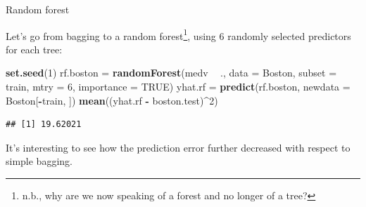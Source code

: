 \documentclass[10pt,ignorenonframetext,]{beamer}
\newenvironment{Shaded}{\begin{snugshade}}{\end{snugshade}}
\newcommand{\KeywordTok}[1]{\textcolor[rgb]{0.13,0.29,0.53}{\textbf{#1}}}
\newcommand{\DataTypeTok}[1]{\textcolor[rgb]{0.13,0.29,0.53}{#1}}
\newcommand{\DecValTok}[1]{\textcolor[rgb]{0.00,0.00,0.81}{#1}}
\newcommand{\StringTok}[1]{\textcolor[rgb]{0.31,0.60,0.02}{#1}}
\newcommand{\OtherTok}[1]{\textcolor[rgb]{0.56,0.35,0.01}{#1}}
\newcommand{\OperatorTok}[1]{\textcolor[rgb]{0.81,0.36,0.00}{\textbf{#1}}}
\newcommand{\NormalTok}[1]{#1}
\begin{document}
\begin{frame}[fragile]

\begin{block}{Random forest}

\vspace{2mm}

Let's go from bagging to a random
forest\footnote{n.b., why are we now speaking of a forest and no longer of a tree?},
using 6 randomly selected predictors for each tree:

\scriptsize

\begin{Shaded}
\begin{Highlighting}[]
\KeywordTok{set.seed}\NormalTok{(}\DecValTok{1}\NormalTok{)}
\NormalTok{rf.boston =}\StringTok{ }\KeywordTok{randomForest}\NormalTok{(medv }\OperatorTok{~}\StringTok{ }\NormalTok{., }\DataTypeTok{data =}\NormalTok{ Boston, }\DataTypeTok{subset =}\NormalTok{ train, }\DataTypeTok{mtry =} \DecValTok{6}\NormalTok{, }
    \DataTypeTok{importance =} \OtherTok{TRUE}\NormalTok{)}
\NormalTok{yhat.rf =}\StringTok{ }\KeywordTok{predict}\NormalTok{(rf.boston, }\DataTypeTok{newdata =}\NormalTok{ Boston[}\OperatorTok{-}\NormalTok{train, ])}
\KeywordTok{mean}\NormalTok{((yhat.rf }\OperatorTok{-}\StringTok{ }\NormalTok{boston.test)}\OperatorTok{^}\DecValTok{2}\NormalTok{)}
\end{Highlighting}
\end{Shaded}

\begin{verbatim}
## [1] 19.62021
\end{verbatim}

\vspace{2mm} \normalsize
It's interesting to see how the prediction error further decreased with
respect to simple bagging.

\end{block}

\end{frame}
\end{document}

